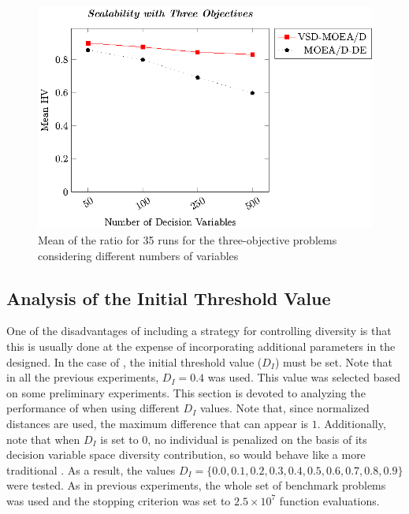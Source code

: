 \begin{figure}[t]
\centering
\includegraphics[scale=0.85]{images/Graphic-Scalability-3obj_tikz-figure0.eps}
\caption{Mean of the \HV{} ratio for 35 runs for the three-objective problems considering different numbers of variables} \label{fig:variable-decision-scalability-3obj}
\end{figure}


\subsection{Analysis of the Initial Threshold Value}

One of the disadvantages of including a strategy for controlling diversity is that this is usually done at the expense of
incorporating additional parameters in the \EA{} designed.
%
In the case of \VSDMOEA{}, the initial threshold value ($D_I$) must be set.
%
Note that in all the previous experiments, $D_I = 0.4$ was used.
%
This value was selected based on some preliminary experiments.
%
This section is devoted to analyzing the performance of \VSDMOEA{} when using different $D_I$ values. 
%
Note that, since normalized distances are used, the maximum difference that can appear is $1$.
%
Additionally, note that when $D_I$ is set to 0, no individual is penalized on the basis of its decision
variable space diversity contribution,
so \VSDMOEA{} would behave like a more traditional \MOEA{}.
%
As a result, the values $D_I = \{0.0, 0.1, 0.2, 0.3, 0.4, 0.5, 0.6, 0.7, 0.8, 0.9\}$ were tested.
%
As in previous experiments, the whole set of benchmark problems was used and
the stopping criterion was set to $2.5 \times 10^7$ function evaluations.

